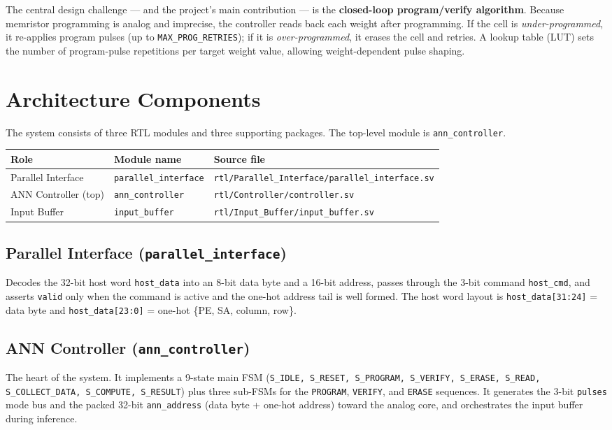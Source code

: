 \documentclass[11pt,a4paper]{article}
\begin{document}
The central design challenge --- and the project's main contribution --- is the
\textbf{closed-loop program/verify algorithm}. Because memristor programming is
analog and imprecise, the controller reads back each weight after programming.
If the cell is \emph{under-programmed}, it re-applies program pulses (up to
\texttt{MAX\_PROG\_RETRIES}); if it is \emph{over-programmed}, it erases the
cell and retries. A lookup table (LUT) sets the number of program-pulse
repetitions per target weight value, allowing weight-dependent pulse shaping.

\section{Architecture Components}

The system consists of three RTL modules and three supporting packages. The
top-level module is \texttt{ann\_controller}.

\begin{table}[h]
\centering
\renewcommand{\arraystretch}{1.3}
\begin{tabularx}{\textwidth}{l l Y}
\toprule
\textbf{Role} & \textbf{Module name} & \textbf{Source file} \\
\midrule
Parallel Interface & \texttt{parallel\_interface} &
  \texttt{rtl/Parallel\_Interface/parallel\_interface.sv} \\
ANN Controller (top) & \texttt{ann\_controller} &
  \texttt{rtl/Controller/controller.sv} \\
Input Buffer & \texttt{input\_buffer} &
  \texttt{rtl/Input\_Buffer/input\_buffer.sv} \\
\bottomrule
\end{tabularx}
\end{table}

\subsection{Parallel Interface (\texttt{parallel\_interface})}
Decodes the 32-bit host word \texttt{host\_data} into an 8-bit data byte and a
16-bit address, passes through the 3-bit command \texttt{host\_cmd}, and asserts
\texttt{valid} only when the command is active and the one-hot address tail is
well formed. The host word layout is
\texttt{host\_data[31:24]} = data byte and
\texttt{host\_data[23:0]} = one-hot \{PE, SA, column, row\}.

\subsection{ANN Controller (\texttt{ann\_controller})}
The heart of the system. It implements a 9-state main FSM
(\texttt{S\_IDLE, S\_RESET, S\_PROGRAM, S\_VERIFY, S\_ERASE, S\_READ,
S\_COLLECT\_DATA, S\_COMPUTE, S\_RESULT}) plus three sub-FSMs for the
\texttt{PROGRAM}, \texttt{VERIFY}, and \texttt{ERASE} sequences. It generates
the 3-bit \texttt{pulses} mode bus and the packed 32-bit \texttt{ann\_address}
(data byte + one-hot address) toward the analog core, and orchestrates the
input buffer during inference.
\end{document}
